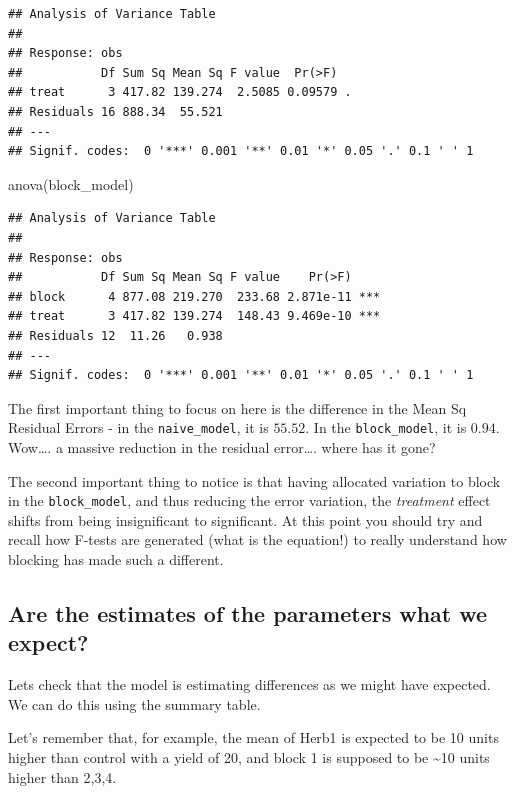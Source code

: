 \documentclass[
]{book}
\newenvironment{Shaded}{\begin{snugshade}}{\end{snugshade}}
\newcommand{\FunctionTok}[1]{\textcolor[rgb]{0.00,0.00,0.00}{#1}}
\newcommand{\NormalTok}[1]{#1}
\begin{document}
\begin{verbatim}
## Analysis of Variance Table
## 
## Response: obs
##           Df Sum Sq Mean Sq F value  Pr(>F)  
## treat      3 417.82 139.274  2.5085 0.09579 .
## Residuals 16 888.34  55.521                  
## ---
## Signif. codes:  0 '***' 0.001 '**' 0.01 '*' 0.05 '.' 0.1 ' ' 1
\end{verbatim}

\begin{Shaded}
\begin{Highlighting}[]
\FunctionTok{anova}\NormalTok{(block\_model)}
\end{Highlighting}
\end{Shaded}

\begin{verbatim}
## Analysis of Variance Table
## 
## Response: obs
##           Df Sum Sq Mean Sq F value    Pr(>F)    
## block      4 877.08 219.270  233.68 2.871e-11 ***
## treat      3 417.82 139.274  148.43 9.469e-10 ***
## Residuals 12  11.26   0.938                      
## ---
## Signif. codes:  0 '***' 0.001 '**' 0.01 '*' 0.05 '.' 0.1 ' ' 1
\end{verbatim}

The first important thing to focus on here is the difference in the Mean Sq Residual Errors - in the \texttt{naive\_model}, it is \(55.52\). In the \texttt{block\_model}, it is \(0.94\). Wow\ldots. a massive reduction in the residual error\ldots. where has it gone?

The second important thing to notice is that having allocated variation to block in the \texttt{block\_model}, and thus reducing the error variation, the \emph{treatment} effect shifts from being insignificant to significant. At this point you should try and recall how F-tests are generated (what is the equation!) to really understand how blocking has made such a different.

\hypertarget{are-the-estimates-of-the-parameters-what-we-expect}{%
\subsection{Are the estimates of the parameters what we expect?}\label{are-the-estimates-of-the-parameters-what-we-expect}}

Lets check that the model is estimating differences as we might have expected. We can do this using the summary table.

Let's remember that, for example, the mean of Herb1 is expected to be 10 units higher than control with a yield of 20, and block 1 is supposed to be \textasciitilde10 units higher than 2,3,4.
\end{document}
